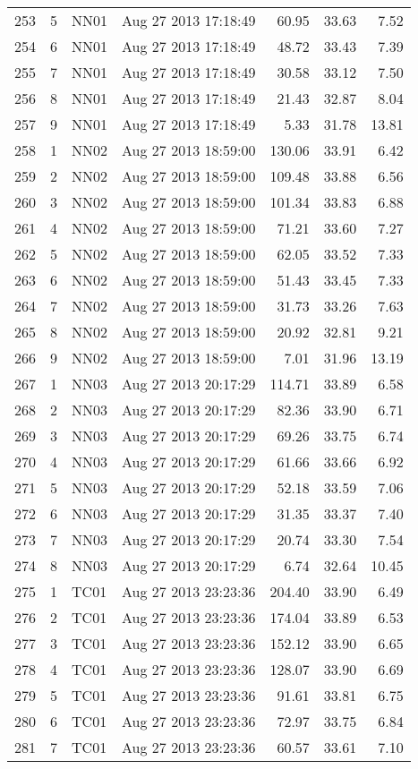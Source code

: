 \documentclass{article}
\begin{document}
\begin{longtable}{ccllrrr}
253&5&NN01&Aug 27 2013 17:18:49&60.95&33.63&7.52\\
254&6&NN01&Aug 27 2013 17:18:49&48.72&33.43&7.39\\
255&7&NN01&Aug 27 2013 17:18:49&30.58&33.12&7.50\\
256&8&NN01&Aug 27 2013 17:18:49&21.43&32.87&8.04\\
257&9&NN01&Aug 27 2013 17:18:49&5.33&31.78&13.81\\
\hline 
258&1&NN02&Aug 27 2013 18:59:00&130.06&33.91&6.42\\
259&2&NN02&Aug 27 2013 18:59:00&109.48&33.88&6.56\\
260&3&NN02&Aug 27 2013 18:59:00&101.34&33.83&6.88\\
261&4&NN02&Aug 27 2013 18:59:00&71.21&33.60&7.27\\
262&5&NN02&Aug 27 2013 18:59:00&62.05&33.52&7.33\\
263&6&NN02&Aug 27 2013 18:59:00&51.43&33.45&7.33\\
264&7&NN02&Aug 27 2013 18:59:00&31.73&33.26&7.63\\
265&8&NN02&Aug 27 2013 18:59:00&20.92&32.81&9.21\\
266&9&NN02&Aug 27 2013 18:59:00&7.01&31.96&13.19\\
\hline 
267&1&NN03&Aug 27 2013 20:17:29&114.71&33.89&6.58\\
268&2&NN03&Aug 27 2013 20:17:29&82.36&33.90&6.71\\
269&3&NN03&Aug 27 2013 20:17:29&69.26&33.75&6.74\\
270&4&NN03&Aug 27 2013 20:17:29&61.66&33.66&6.92\\
271&5&NN03&Aug 27 2013 20:17:29&52.18&33.59&7.06\\
272&6&NN03&Aug 27 2013 20:17:29&31.35&33.37&7.40\\
273&7&NN03&Aug 27 2013 20:17:29&20.74&33.30&7.54\\
274&8&NN03&Aug 27 2013 20:17:29&6.74&32.64&10.45\\
\hline 
275&1&TC01&Aug 27 2013 23:23:36&204.40&33.90&6.49\\
276&2&TC01&Aug 27 2013 23:23:36&174.04&33.89&6.53\\
277&3&TC01&Aug 27 2013 23:23:36&152.12&33.90&6.65\\
278&4&TC01&Aug 27 2013 23:23:36&128.07&33.90&6.69\\
279&5&TC01&Aug 27 2013 23:23:36&91.61&33.81&6.75\\
280&6&TC01&Aug 27 2013 23:23:36&72.97&33.75&6.84\\
281&7&TC01&Aug 27 2013 23:23:36&60.57&33.61&7.10\\

\end{longtable}
\end{document}
